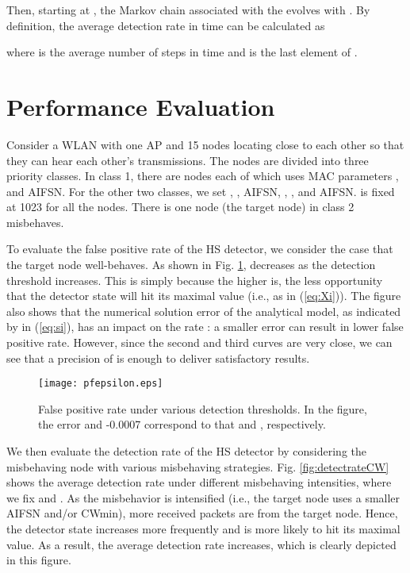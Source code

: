 \documentclass[conference]{IEEEtran}
\begin{document}
Then, starting at , the Markov chain associated with the  evolves with . By definition, the average detection rate in time  can be calculated as

where  is the average number of steps in time  and  is the last element of .


\section{Performance Evaluation}\label{sec:numerical}
Consider a WLAN with one AP and 15 nodes locating close to each other so that they can hear each other's transmissions. The nodes are divided into three priority classes. In class 1, there are  nodes each of which uses MAC parameters ,  and AIFSN. For the other two classes, we set , , AIFSN, , , and AIFSN.  is fixed at 1023 for all the nodes. There is one node (the target node) in class 2 misbehaves.

To evaluate the false positive rate  of the HS detector, we consider the case that the target node well-behaves. As shown in Fig. \ref{fig:pf},  decreases as the detection threshold  increases. This is simply because the higher  is, the less opportunity that the detector state  will hit its maximal value (i.e.,  as in (\ref{eq:Xi})). The figure also shows that the numerical solution error of the analytical model, as indicated by  in (\ref{eq:si}), has an impact on the rate : a smaller error can result in lower false positive rate. However, since the second and third curves are very close, we can see that a precision of  is enough to deliver satisfactory results.

\begin{figure}[htbp]
\centering
  \texttt{[image: pfepsilon.eps]}
\vspace{-3mm}
  \caption{False positive rate  under various detection thresholds. In the figure, the error  and -0.0007 correspond to that  and , respectively.}\label{fig:pf}
\vspace{-4mm}
\end{figure}

We then evaluate the detection rate of the HS detector by considering the misbehaving node with various misbehaving strategies. Fig. \ref{fig:detectrateCW} shows the average detection rate  under different misbehaving intensities, where we fix  and . As the misbehavior is intensified (i.e., the target node uses a smaller AIFSN and/or CWmin), more received packets are from the target node. Hence, the detector state increases more frequently and is more likely to hit its maximal value. As a result, the average detection rate increases, which is clearly depicted in this figure.
\end{document}
